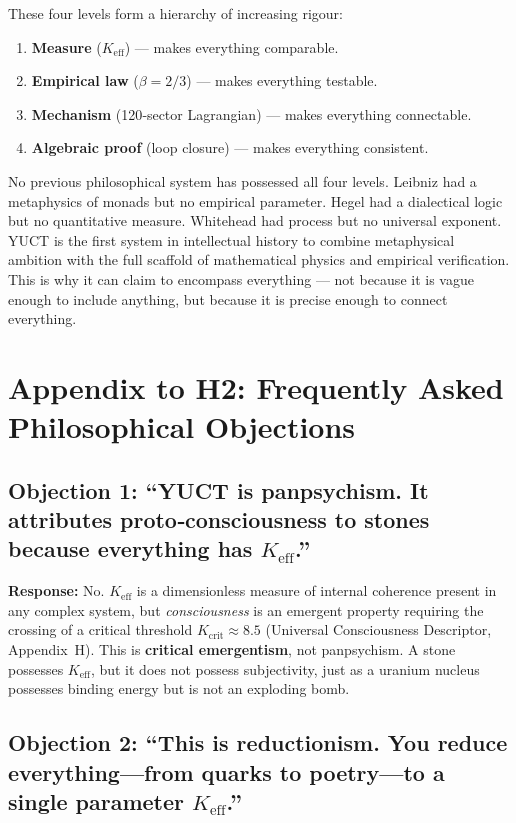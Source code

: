 \documentclass[12pt,a4paper]{article}
\newcommand{\Keff}{K_{\mathrm{eff}}}
\begin{document}
	These four levels form a hierarchy of increasing rigour:
	\begin{enumerate}[leftmargin=*]
		\item \textbf{Measure} (\(K_{\mathrm{eff}}\)) — makes everything comparable.
		\item \textbf{Empirical law} (\(\beta = 2/3\)) — makes everything testable.
		\item \textbf{Mechanism} (120‑sector Lagrangian) — makes everything connectable.
		\item \textbf{Algebraic proof} (loop closure) — makes everything consistent.
	\end{enumerate}
	No previous philosophical system has possessed all four levels. Leibniz had a metaphysics of monads but no empirical parameter. Hegel had a dialectical logic but no quantitative measure. Whitehead had process but no universal exponent. YUCT is the first system in intellectual history to combine metaphysical ambition with the full scaffold of mathematical physics and empirical verification. This is why it can claim to encompass everything — not because it is vague enough to include anything, but because it is precise enough to connect everything.
	
	\section*{Appendix to H2: Frequently Asked Philosophical Objections}
	
	\subsection*{Objection 1: ``YUCT is panpsychism. It attributes proto‑consciousness to stones because everything has \(\Keff\).''}
	
	\textbf{Response:} No. \(\Keff\) is a dimensionless measure of internal coherence present in any complex system, but \emph{consciousness} is an emergent property requiring the crossing of a critical threshold \(K_{\mathrm{crit}} \approx 8.5\) (Universal Consciousness Descriptor, Appendix~H). This is \textbf{critical emergentism}, not panpsychism. A stone possesses \(\Keff\), but it does not possess subjectivity, just as a uranium nucleus possesses binding energy but is not an exploding bomb.
	
	\subsection*{Objection 2: ``This is reductionism. You reduce everything---from quarks to poetry---to a single parameter \(\Keff\).''}
	
\end{document}
